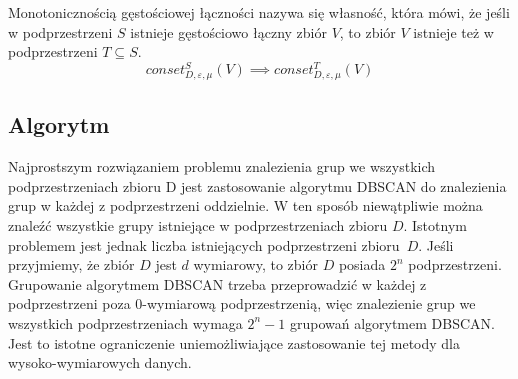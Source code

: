 \newline
Monotonicznością gęstościowej łączności nazywa się własność, która mówi, że jeśli w podprzestrzeni $ S $ istnieje gęstościowo łączny zbiór $ V $, to zbiór $ V $ istnieje też w podprzestrzeni $ T \subseteq S $.
\begin{equation}
	conset^S_{D,\varepsilon,\mu}(V) \implies conset^T_{D,\varepsilon,\mu}(V)
\end{equation}

\subsection{Algorytm}
Najprostszym rozwiązaniem problemu znalezienia grup we wszystkich podprzestrzeniach zbioru D jest zastosowanie algorytmu DBSCAN do znalezienia grup w każdej z podprzestrzeni oddzielnie. W ten sposób niewątpliwie można znaleźć wszystkie grupy istniejące w podprzestrzeniach zbioru $ D $. Istotnym problemem jest jednak liczba istniejących podprzestrzeni \mbox{zbioru $ D $}. Jeśli przyjmiemy, że zbiór $ D $ jest $ d $ wymiarowy, to zbiór $ D $ posiada $ 2^n $ podprzestrzeni. Grupowanie algorytmem DBSCAN trzeba przeprowadzić w każdej z podprzestrzeni poza $ 0 $-wymiarową podprzestrzenią, więc znalezienie grup we wszystkich podprzestrzeniach wymaga $ 2^n-1 $ grupowań algorytmem DBSCAN. Jest to istotne ograniczenie uniemożliwiające zastosowanie tej metody dla wysoko-wymiarowych danych.

